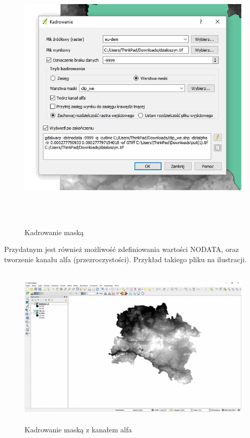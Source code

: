 \documentclass[12pt,a4paper]{book}
\begin{document}
\begin{center}
\begin{figure}
\includegraphics[width=15.452cm,height=13.229cm]{004-raster-maska.png}
\caption{Kadrowanie maską}
\end{figure}
\end{center}
Przydatnym jest również możliwość zdefiniowania wartości NODATA, oraz tworzenie kanału alfa (przezroczystości). Przykład takiego pliku na ilustracji.

\begin{center}
\begin{figure}
\includegraphics[width=13cm,height=7.796cm]{004-raster-alfa.jpg}
\caption{Kadrowanie maską z kanałem alfa} \label{fig:maskaalfa}
\end{figure}
\end{center}
\end{document}
